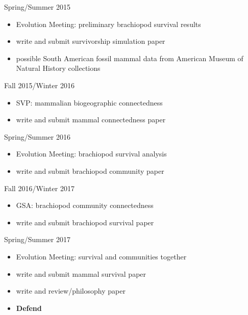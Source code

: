 \documentclass[12pt,letterpaper]{article}
\begin{document}
Spring/Summer 2015
\begin{itemize}
  \item Evolution Meeting: preliminary brachiopod survival results
  \item write and submit survivorship simulation paper
  \item possible South American fossil mammal data from American Museum of Natural History collections
\end{itemize}

Fall 2015/Winter 2016
\begin{itemize}
  \item SVP: mammalian biogeographic connectedness
  \item write and submit mammal connectedness paper
\end{itemize}

Spring/Summer 2016
\begin{itemize}
  \item Evolution Meeting: brachiopod survival analysis
  \item write and submit brachiopod community paper
\end{itemize}

Fall 2016/Winter 2017
\begin{itemize}
  \item GSA: brachiopod community connectedness
  \item write and submit brachiopod survival paper
\end{itemize}

Spring/Summer 2017
\begin{itemize}
  \item Evolution Meeting: survival and communities together
  \item write and submit mammal survival paper
  \item write and review/philosophy paper
  \item \textbf{Defend}
\end{itemize}

\clearpage


\end{document}
